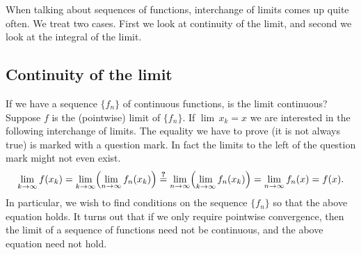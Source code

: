 \documentclass[12pt]{book}
\theoremstyle{plain}
\theoremstyle{remark}
\theoremstyle{definition}
\theoremstyle{exercise}
\theoremstyle{example}
\begin{document}
When talking about sequences of functions, interchange of limits comes up
quite often.  We treat two cases.  First we look at continuity of
the limit, and second we look at the integral of the limit.

\subsection{Continuity of the limit}

If we have a sequence $\{ f_n \}$ of continuous functions, is the limit continuous?
Suppose $f$ is the (pointwise) limit of $\{ f_n \}$.
If $\lim\, x_k = x$
we are interested in the following
interchange of limits.  The equality we have to prove (it is not always true)
is marked with a question mark.  In fact the limits to the left
of the question mark might not even exist.
\begin{equation*}
\lim_{k \to \infty} 
f(x_k)
=
\lim_{k \to \infty} 
\Bigl(
\lim_{n \to \infty} f_n(x_k)
\Bigr)
\overset{\text{\textbf{?}}}{=}
\lim_{n \to \infty}
\Bigl(
\lim_{k \to \infty} 
f_n(x_k)
\Bigr)
=
\lim_{n \to \infty}
f_n(x)
=
f(x) .
\end{equation*}
In particular, we wish to find conditions on the sequence $\{ f_n \}$
so that the above equation holds.
It turns out that if we only require pointwise convergence, then the limit
of a sequence of functions need not be continuous, and the above equation
need not hold.
\end{document}
